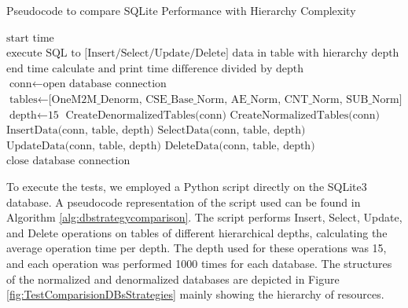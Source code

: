 \documentclass[a4paper,fleqn]{cas-dc}
\begin{document}
\begin{algorithm}
\scriptsize
\caption{Pseudocode to compare SQLite Performance with Hierarchy Complexity}
\label{alg:dbstrategycomparison}
\begin{algorithmic}[1]
    \State $\text{start time}$
        \State $\text{execute SQL to [Insert/Select/Update/Delete] data in table with hierarchy depth i}$
    \EndFor
    \State $\text{end time}$
    \State $\text{calculate and print time difference divided by depth}$
\EndProcedure
\\
    \State $\text{conn} \gets \text{open database connection}$
    \State $\text{tables} \gets \text{[OneM2M\_Denorm, CSE\_Base\_Norm, AE\_Norm, CNT\_Norm, SUB\_Norm]}$
    \State $\text{depth} \gets \text{15}$
    \State $\text{CreateDenormalizedTables(conn)}$
    \State $\text{CreateNormalizedTables(conn)}$
        \State $\text{InsertData(conn, table, depth)}$
        \State $\text{SelectData(conn, table, depth)}$
        \State $\text{UpdateData(conn, table, depth)}$
        \State $\text{DeleteData(conn, table, depth)}$
    \EndFor
    \State $\text{close database connection}$
\EndProcedure
\end{algorithmic}
\end{algorithm}

To execute the tests, we employed a Python script directly on the SQLite3 database. A pseudocode representation of the script used can be found in Algorithm \ref{alg:dbstrategycomparison}. The script performs Insert, Select, Update, and Delete operations on tables of different hierarchical depths, calculating the average operation time per depth. The depth used for these operations was 15, and each operation was performed 1000 times for each database. The structures of the normalized and denormalized databases are depicted in Figure \ref{fig:TestComparisionDBsStrategies} mainly showing the hierarchy of resources.
\end{document}
